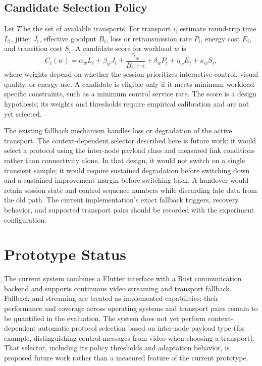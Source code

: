 \documentclass[conference]{IEEEtran}
\begin{document}
\subsection{Candidate Selection Policy}
Let $T$ be the set of available transports. For transport $i$, estimate
round-trip time $L_i$, jitter $J_i$, effective goodput $B_i$, loss or
retransmission rate $P_i$, energy cost $E_i$, and transition cost $S_i$.
A candidate score for workload $w$ is
\begin{equation}
C_i(w) = \alpha_w L_i + \beta_w J_i +
\frac{\gamma_w}{B_i+\epsilon} + \delta_w P_i +
\eta_w E_i + \kappa_w S_i ,
\label{eq:cost}
\end{equation}
where weights depend on whether the session prioritizes interactive control,
visual quality, or energy use. A candidate is eligible only if it meets
minimum workload-specific constraints, such as a minimum control service
rate. The score is a design hypothesis; its weights and thresholds require
empirical calibration and are not yet selected.

The existing fallback mechanism handles loss or degradation of the active
transport. The context-dependent selector described here is future work: it
would select a protocol using the inter-node payload class and measured link
conditions rather than connectivity alone. In that design, it would not
switch on a single transient sample; it would require sustained degradation
before switching down and a sustained improvement margin before switching
back. A handover would retain session state and control sequence numbers while
discarding late data from the old path. The current implementation's exact
fallback triggers, recovery behavior, and supported transport pairs should
be recorded with the experiment configuration.

\section{Prototype Status}
The current system combines a Flutter interface with a Rust communication
backend and supports continuous video streaming and transport fallback.
Fallback and streaming are treated as implemented capabilities; their
performance and coverage across operating systems and transport pairs remain
to be quantified in the evaluation. The system does not yet perform
context-dependent automatic protocol selection based on inter-node payload
type (for example, distinguishing control messages from video when choosing
a transport). That selector, including its policy thresholds and adaptation
behavior, is proposed future work rather than a measured feature of the
current prototype.
\end{document}
